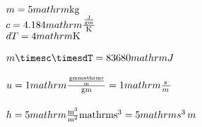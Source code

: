 \documentclass{article}
\begin{document}
$m=5\\mathrm{\mathrm{kg}}$\\
$c=4.184\\mathrm{\mathrm{\frac{\mathrm{\frac{\mathrm{J}}{\mathrm{gm}}}}{\mathrm{K}}}}$\\
$dT=4\\mathrm{\mathrm{K}}$\\
\\$m\timesc\timesdT=83680\\mathrm{J}$\\
\\$u=1\\mathrm{\mathrm{\frac{\mathrm{\frac{\mathrm{\mathrm{gm}\\mathrm{s}}}{\mathrm{m}}}}{\mathrm{gm}}}}=1\\mathrm{\frac{s\,}{m\,}}$\\
\\$h=5\\mathrm{\mathrm{\mathrm{\frac{\mathrm{\mathrm{m}^{3}}}{\mathrm{\mathrm{m}^{2}}}}\\mathrm{\mathrm{s}^{3}}}}=5\\mathrm{s^{3}\,m\,}$\\
\end{document}
